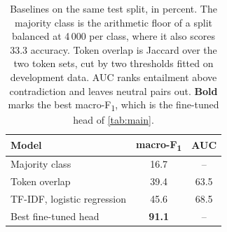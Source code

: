 \begin{table}[t]
\centering\small
\begin{tabular}{l cc}
\toprule
Model & macro-F\textsubscript{1} & AUC \\
\midrule
Majority class & 16.7 & -- \\
Token overlap & 39.4 & 63.5 \\
TF-IDF, logistic regression & 45.6 & 68.5 \\
\addlinespace
Best fine-tuned head & \textbf{91.1} & -- \\
\bottomrule
\end{tabular}
\caption{Baselines on the same test split, in percent. The majority class is the arithmetic floor of a split balanced at 4\,000 per class, where it also scores 33.3 accuracy. Token overlap is Jaccard over the two token sets, cut by two thresholds fitted on development data. AUC ranks entailment above contradiction and leaves neutral pairs out. \textbf{Bold} marks the best macro-F\textsubscript{1}, which is the fine-tuned head of \autoref{tab:main}.}
\label{tab:baselines}
\end{table}
